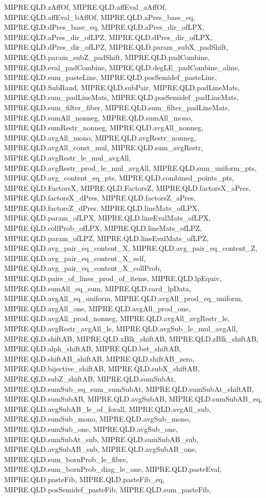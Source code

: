 \begin{lemma}
{  MIPRE.QLD.zAffOf, MIPRE.QLD.affEval_aAffOf, MIPRE.QLD.affEval_bAffOf, MIPRE.QLD.aPres_base_eq,
  MIPRE.QLD.dPres_base_eq, MIPRE.QLD.aPres_dir_ofLPX, MIPRE.QLD.aPres_dir_ofLPZ,
  MIPRE.QLD.dPres_dir_ofLPX, MIPRE.QLD.dPres_dir_ofLPZ, MIPRE.QLD.param_subX_padShift,
  MIPRE.QLD.param_subZ_padShift, MIPRE.QLD.padCombine, MIPRE.QLD.eval_padCombine,
  MIPRE.QLD.degLE_padCombine_aline, MIPRE.QLD.sum_pasteLine, MIPRE.QLD.posSemidef_pasteLine,
  MIPRE.QLD.SubRand, MIPRE.QLD.subPair, MIPRE.QLD.padLineMats, MIPRE.QLD.sum_padLineMats,
  MIPRE.QLD.posSemidef_padLineMats, MIPRE.QLD.sum_filter_fiber, MIPRE.QLD.sum_filter_padLineMats,
  MIPRE.QLD.sumAll_nonneg, MIPRE.QLD.sumAll_mono, MIPRE.QLD.sumRestr_nonneg,
  MIPRE.QLD.avgAll_nonneg, MIPRE.QLD.avgAll_mono, MIPRE.QLD.avgRestr_nonneg,
  MIPRE.QLD.avgAll_const_mul, MIPRE.QLD.sum_avgRestr, MIPRE.QLD.avgRestr_le_mul_avgAll,
  MIPRE.QLD.avgRestr_prod_le_mul_avgAll, MIPRE.QLD.sum_uniform_pts, MIPRE.QLD.avg_content_eq_pts,
  MIPRE.QLD.combined_points_pts, MIPRE.QLD.FactorsX, MIPRE.QLD.FactorsZ, MIPRE.QLD.factorsX_aPres,
  MIPRE.QLD.factorsX_dPres, MIPRE.QLD.factorsZ_aPres, MIPRE.QLD.factorsZ_dPres,
  MIPRE.QLD.lineMats_ofLPX, MIPRE.QLD.param_ofLPX, MIPRE.QLD.lineEvalMats_ofLPX,
  MIPRE.QLD.collProb_ofLPX, MIPRE.QLD.lineMats_ofLPZ, MIPRE.QLD.param_ofLPZ,
  MIPRE.QLD.lineEvalMats_ofLPZ, MIPRE.QLD.avg_pair_eq_content_X, MIPRE.QLD.avg_pair_eq_content_Z,
  MIPRE.QLD.avg_pair_eq_content_X_self, MIPRE.QLD.avg_pair_eq_content_X_collProb,
  MIPRE.QLD.pairs_of_lines_prod_of_items, MIPRE.QLD.lpEquiv, MIPRE.QLD.sumAll_eq_sum,
  MIPRE.QLD.card_lpData, MIPRE.QLD.avgAll_eq_uniform, MIPRE.QLD.avgAll_prod_eq_uniform,
  MIPRE.QLD.avgAll_one, MIPRE.QLD.avgAll_prod_one, MIPRE.QLD.avgAll_prod_nonneg,
  MIPRE.QLD.avgAll_avgRestr_le, MIPRE.QLD.avgRestr_avgAll_le, MIPRE.QLD.avgSub_le_mul_avgAll,
  MIPRE.QLD.shiftAB, MIPRE.QLD.xBlk_shiftAB, MIPRE.QLD.zBlk_shiftAB, MIPRE.QLD.alph_shiftAB,
  MIPRE.QLD.bet_shiftAB, MIPRE.QLD.shiftAB_shiftAB, MIPRE.QLD.shiftAB_zero,
  MIPRE.QLD.bijective_shiftAB, MIPRE.QLD.subX_shiftAB, MIPRE.QLD.subZ_shiftAB, MIPRE.QLD.sumSubAt,
  MIPRE.QLD.sumSub_eq_sum_sumSubAt, MIPRE.QLD.sumSubAt_shiftAB, MIPRE.QLD.sumSubAB,
  MIPRE.QLD.avgSubAB, MIPRE.QLD.sumSubAB_eq, MIPRE.QLD.avgSubAB_le_of_forall, MIPRE.QLD.avgAll_sub,
  MIPRE.QLD.sumSub_mono, MIPRE.QLD.avgSub_mono, MIPRE.QLD.sumSub_one, MIPRE.QLD.avgSub_one,
  MIPRE.QLD.sumSubAt_sub, MIPRE.QLD.sumSubAB_sub, MIPRE.QLD.avgSubAB_sub, MIPRE.QLD.avgSubAB_one,
  MIPRE.QLD.sum_bornProb_le_fibre, MIPRE.QLD.sum_bornProb_diag_le_one, MIPRE.QLD.pasteEval,
  MIPRE.QLD.pasteFib, MIPRE.QLD.pasteFib_eq, MIPRE.QLD.posSemidef_pasteFib, MIPRE.QLD.sum_pasteFib,
}
\end{lemma}
